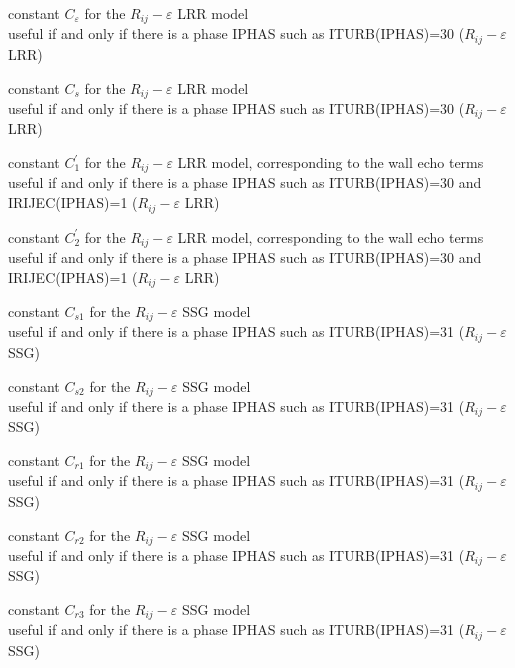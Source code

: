 {constant $C_\varepsilon$ for the $R_{ij}-\varepsilon$ LRR model\\
useful if and only if there is a phase IPHAS such as ITURB(IPHAS)=30
($R_{ij}-\varepsilon$ LRR)}

{constant $C_s$ for the $R_{ij}-\varepsilon$ LRR model\\
useful if and only if there is a phase IPHAS such as ITURB(IPHAS)=30
($R_{ij}-\varepsilon$ LRR)}

{constant $C_1^\prime$ for the $R_{ij}-\varepsilon$ LRR model, corresponding to
the wall echo terms\\
useful if and only if there is a phase IPHAS such as ITURB(IPHAS)=30 and IRIJEC(IPHAS)=1
($R_{ij}-\varepsilon$ LRR)}

{constant $C_2^\prime$ for the $R_{ij}-\varepsilon$ LRR model, corresponding to
the wall echo terms\\
useful if and only if there is a phase IPHAS such as ITURB(IPHAS)=30 and IRIJEC(IPHAS)=1
($R_{ij}-\varepsilon$ LRR)}


{constant $C_{s1}$ for the $R_{ij}-\varepsilon$ SSG model\\
useful if and only if there is a phase IPHAS such as ITURB(IPHAS)=31
($R_{ij}-\varepsilon$ SSG)}

{constant $C_{s2}$ for the $R_{ij}-\varepsilon$ SSG model\\
useful if and only if there is a phase IPHAS such as ITURB(IPHAS)=31
($R_{ij}-\varepsilon$ SSG)}

{constant $C_{r1}$ for the $R_{ij}-\varepsilon$ SSG model\\
useful if and only if there is a phase IPHAS such as ITURB(IPHAS)=31
($R_{ij}-\varepsilon$ SSG)}

{constant $C_{r2}$ for the $R_{ij}-\varepsilon$ SSG model\\
useful if and only if there is a phase IPHAS such as ITURB(IPHAS)=31
($R_{ij}-\varepsilon$ SSG)}

{constant $C_{r3}$ for the $R_{ij}-\varepsilon$ SSG model\\
useful if and only if there is a phase IPHAS such as ITURB(IPHAS)=31
($R_{ij}-\varepsilon$ SSG)}

